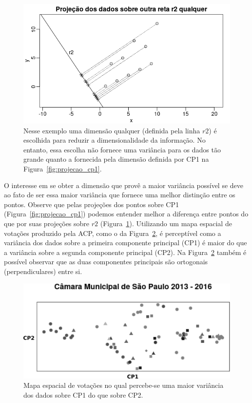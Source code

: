 \documentclass[
	article,			%
	12pt,				%
	oneside,			%
	a4paper,			%
	english,			%
	brazil,				%
	sumario=tradicional,
	oldfontcommands %
	]{abntex2}
\begin{document}
\begin{figure}[h]
  \centering
  \includegraphics[scale=0.7]{figs/projecao_r2.png}
  \caption{Nesse exemplo uma dimensão qualquer (definida pela linha $r2$) é escolhida para reduzir a dimensionalidade da informação. No entanto, essa escolha não fornece uma variância para os dados tão grande quanto a fornecida pela dimensão definida por CP1 na Figura~\ref{fig:projecao_cp1}.}
  \label{fig:projecao_r2}
\end{figure}

O interesse em se obter a dimensão que provê a maior variância possível se deve ao fato de ser essa maior variância que fornece uma melhor distinção entre os pontos. Observe que pelas projeções dos pontos sobre CP1 (Figura~\ref{fig:projecao_cp1}) podemos entender melhor a diferença entre pontos do que por suas projeções sobre $r2$ (Figura~\ref{fig:projecao_r2}). Utilizando um mapa espacial de votações produzido pela ACP, como o da Figura~\ref{fig:cps}, é perceptível como a variância dos dados sobre a primeira componente principal (CP1) é maior do que a variância sobre a segunda componente principal (CP2). Na Figura~\ref{fig:cps} também é possível observar que as duas componentes principais são ortogonais (perpendiculares) entre si.

\begin{figure}[h]
  \centering
  \includegraphics[scale=0.7]{figs/cps.png}
  \caption{Mapa espacial de votações no qual percebe-se uma maior variância dos dados sobre CP1 do que sobre CP2.}
  \label{fig:cps}
\end{figure}
\end{document}
